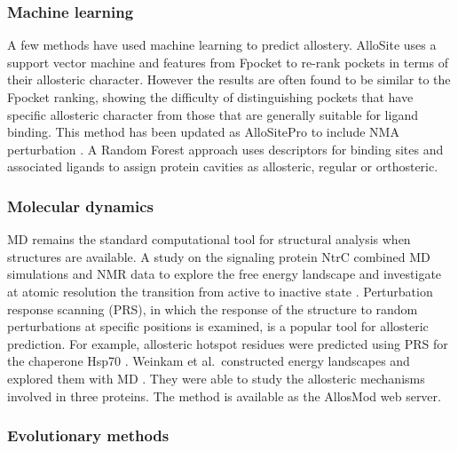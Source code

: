\subsubsection{Machine learning}

A few methods have used machine learning to predict allostery.
AlloSite \cite{Huang2013} uses a support vector machine and features from Fpocket \cite{LeGuilloux2009} to re-rank pockets in terms of their allosteric character.
However the results are often found to be similar to the Fpocket ranking, showing the difficulty of distinguishing pockets that have specific allosteric character from those that are generally suitable for ligand binding.
This method has been updated as AlloSitePro to include NMA perturbation \cite{Song2017}.
A Random Forest approach \cite{Chen2016} uses descriptors for binding sites and associated ligands to assign protein cavities as allosteric, regular or orthosteric.


\subsubsection{Molecular dynamics}

MD remains the standard computational tool for structural analysis when structures are available.
A study on the signaling protein NtrC combined MD simulations and NMR data to explore the free energy landscape and investigate at atomic resolution the transition from active to inactive state \cite{Pontiggia2015}.
Perturbation response scanning (PRS), in which the response of the structure to random perturbations at specific positions is examined, is a popular tool for allosteric prediction.
For example, allosteric hotspot residues were predicted using PRS for the chaperone Hsp70 \cite{Penkler2017}.
Weinkam et al.\ constructed energy landscapes and explored them with MD \cite{Weinkam2012}.
They were able to study the allosteric mechanisms involved in three proteins.
The method is available as the AllosMod web server.


\subsubsection{Evolutionary methods}

